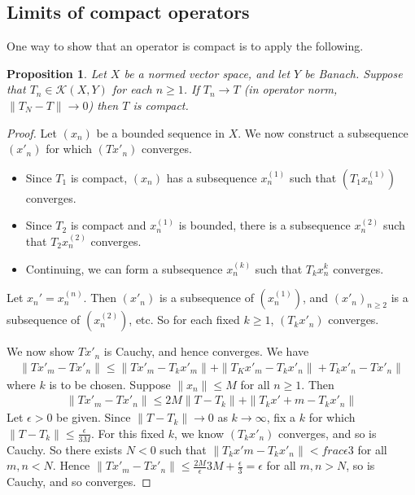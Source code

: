 \documentclass[10pt, oneside, reqno]{amsart}
\theoremstyle{plain}%
\newtheorem{prop}[thm]{Proposition}
\theoremstyle{definition}
\theoremstyle{remark}
\begin{document}
\subsection{Limits of compact operators} %
\label{sub:limits_of_compact_operators}
One way to show that an operator is compact is to apply the following.  
\begin{prop}
    Let $X$ be a normed vector space, and let $Y$ be Banach.  Suppose that $T_n \in \mathcal K(X, Y)$ for each $n \geq 1$.  If $T_n \rightarrow T$ (in operator norm, $\| T_N - T \| \rightarrow 0$) then $T$ is compact.  
\end{prop}
\begin{proof}
    Let $(x_n)$ be a bounded sequence in $X$.  We now construct a subsequence $(x'_n)$ for which $(Tx'_n)$ converges.  \begin{itemize}
        \item Since $T_1$ is compact, $(x_n)$ has a subsequence $x^{(1)}_n$ such that $(T_1 x^{(1)}_n)$ converges. 
        \item Since $T_2$ is compact and $x^{(1)}_n$ is bounded, there is a subsequence $x_n^{(2)}$ such that $T_2 x^{(2)}_n$ converges. 
        \item Continuing, we can form a subsequence $x^{(k)}_n$ such that $T_k x^{k}_n$ converges. 
    \end{itemize}

Let $x_n' = x_n^{(n)}$.  Then $(x'_n)$ is a subsequence of $(x_n^{(1)})$, and $(x'_n)_{n \geq 2}$ is a subsequence of $(x_n^{(2)})$, etc.  So for each fixed $k \geq 1$, $(T_k x'_n)$ converges.  

We now show $T x'_n$ is Cauchy, and hence converges.  We have \begin{align*}
    \| Tx'_m - T x'_n \| \leq \| T x'_m - T_k x'_m \| + \| T_K x'_m - T_k x'_n \| + T_k x'_n - T x'_n \|
\end{align*} where $k$ is to be chosen.  Suppose $\| x_n \| \leq M$ for all $n \geq 1$.  Then \begin{align*}
    \| Tx'_m - T x'_n \| \leq 2 M \| T - T_k \| + \| T_k x'+m - T_k x'_n \|
\end{align*} Let $\epsilon > 0$ be given. Since $\| T - T_k \| \rightarrow 0$ as $ k \rightarrow \infty$, fix a $k$ for which $\| T - T_k \| \leq \frac{\epsilon}{3M}$.  For this fixed $k$, we know $(T_k x'_n)$ converges, and so is Cauchy.  So there exists $N < 0$ such that $\| T_k x'm - T_k x'_n\| < frac{\epsilon}{3}$ for all $m,n < N$.  Hence $\|T x'_m - Tx'_n \| \leq \frac{2M}{\epsilon}{3M} + \frac{\epsilon}{3} = \epsilon$ for all $m , n > N$, so is Cauchy, and so converges. 
\end{proof}
\end{document}
